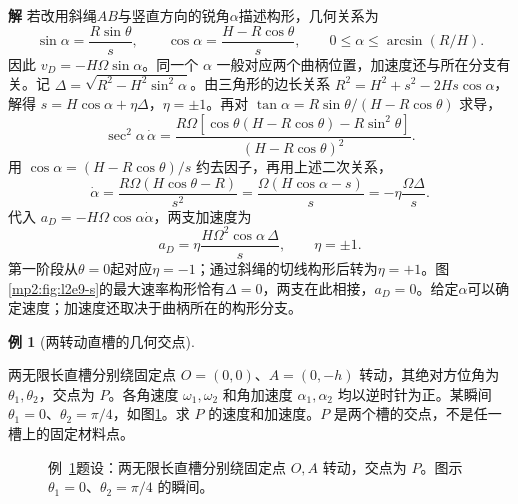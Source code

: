 \documentclass[11pt,openany,fontset=fandol]{ctexbook}
\theoremstyle{definition}\newtheorem{example}{例}[chapter]\newtheorem{exercise}{习题}[chapter]
\newcommand{\SolutionStart}{\par\medskip\ifdim\pagetotal>0pt\ifdim\dimexpr\pagegoal-\pagetotal\relax<3\baselineskip\newpage\fi\fi\noindent\textbf{解}\quad\ignorespaces}
\newenvironment{solution}{\SolutionStart}{\par\medskip}
\begin{document}
\begin{solution}
若改用斜绳$AB$与竖直方向的锐角$\alpha$描述构形，几何关系为
\[
 \sin\alpha=\frac{R\sin\theta}{s},\qquad
 \cos\alpha=\frac{H-R\cos\theta}{s},\qquad
 0\le\alpha\le\arcsin(R/H).
\]
因此 $v_D=-H\Omega\sin\alpha$。同一个 $\alpha$ 一般对应两个曲柄位置，加速度还与所在分支有关。记 $\Delta=\sqrt{R^2-H^2\sin^2\alpha}$。由三角形的边长关系 $R^2=H^2+s^2-2Hs\cos\alpha$，解得 $s=H\cos\alpha+\eta\Delta$，$\eta=\pm1$。再对
$\tan\alpha=R\sin\theta/(H-R\cos\theta)$ 求导，
\[
\sec^2\alpha\,\dot\alpha
=\frac{R\Omega[\cos\theta(H-R\cos\theta)-R\sin^2\theta]}
{(H-R\cos\theta)^2}.
\]
用 $\cos\alpha=(H-R\cos\theta)/s$ 约去因子，再用上述二次关系，
\[
\dot\alpha=\frac{R\Omega(H\cos\theta-R)}{s^2}
=\frac{\Omega(H\cos\alpha-s)}s
=-\eta\frac{\Omega\Delta}s.
\]
代入 $a_D=-H\Omega\cos\alpha\dot\alpha$，两支加速度为
\[
 a_D=\eta\frac{H\Omega^2\cos\alpha\,\Delta}{s},\qquad\eta=\pm1.
\]
第一阶段从$\theta=0$起对应$\eta=-1$；通过斜绳的切线构形后转为$\eta=+1$。图\ref{mp2:fig:l2e9-s}的最大速率构形恰有$\Delta=0$，两支在此相接，$a_D=0$。给定$\alpha$可以确定速度；加速度还取决于曲柄所在的构形分支。
\end{solution}

\par\medskip\noindent\begin{minipage}{\textwidth}
\begin{example}[两转动直槽的几何交点]\label{mp2:ex:l2e10}

两无限长直槽分别绕固定点 $O=(0,0)$、$A=(0,-h)$ 转动，其绝对方位角为 $\theta_1,\theta_2$，交点为 $P$。各角速度 $\omega_1,\omega_2$ 和角加速度 $\alpha_1,\alpha_2$ 均以逆时针为正。某瞬间 $\theta_1=0$、$\theta_2=\pi/4$，如图\ref{mp2:fig:l2e10-q}。求 $P$ 的速度和加速度。$P$ 是两个槽的交点，不是任一槽上的固定材料点。

\end{example}

\begin{figure}[H]\centering
{}
\caption{例~\ref{mp2:ex:l2e10}题设：两无限长直槽分别绕固定点 $O,A$ 转动，交点为 $P$。图示 $\theta_1=0$、$\theta_2=\pi/4$ 的瞬间。}\label{mp2:fig:l2e10-q}
\end{figure}
\end{minipage}\par\medskip
\end{document}
